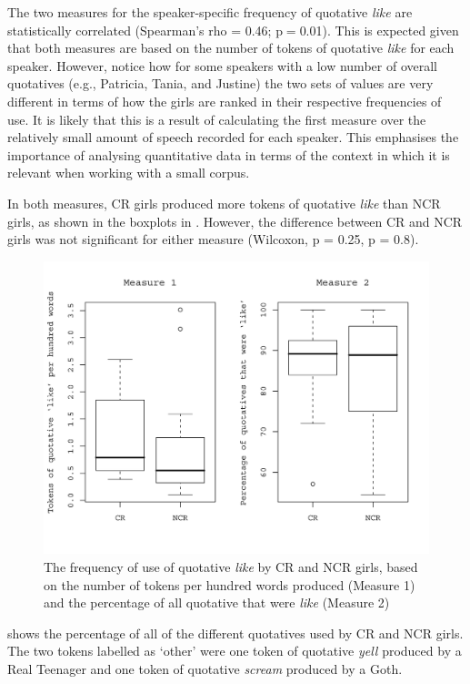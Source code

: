 The two measures for the speaker-specific frequency of quotative \textit{like} are statistically correlated (Spearman's rho = 0.46; p$=$0.01). This is expected given that both measures are based on the number of tokens of quotative \textit{like} for each speaker. However, notice how for some speakers with a low number of overall quotatives (e.g., Patricia, Tania, and Justine) the two sets of values are very different in terms of how the girls are ranked in their respective frequencies of use. It is likely that this is a result of calculating the first measure over the relatively small amount of speech recorded for each speaker. This emphasises the importance of analysing quantitative data in terms of the context in which it is relevant when working with a small corpus. 

In both measures, CR girls produced more tokens of quotative \textit{like} than NCR girls, as shown in the boxplots in . However, the difference between CR and NCR girls was not significant for either measure (Wilcoxon, p = 0.25, p = 0.8). 

\begin{figure}[p]
	\centering
		\includegraphics[height=.4\textheight]{images/ComparingQLikeMeasures.jpg}
	\caption{The frequency of use of quotative \textit{like} by CR and NCR girls, based on the number of tokens per hundred words produced (Measure 1) and the percentage of all quotative that were \textit{like} (Measure 2)}
	\label{fig:ComparingQLikeMeasures}
\end{figure}

 shows the percentage of all of the different quotatives used by CR and NCR girls. The two tokens labelled as `other' were one token of quotative \textit{yell} produced by a Real Teenager and one token of quotative \textit{scream} produced by a Goth. 

